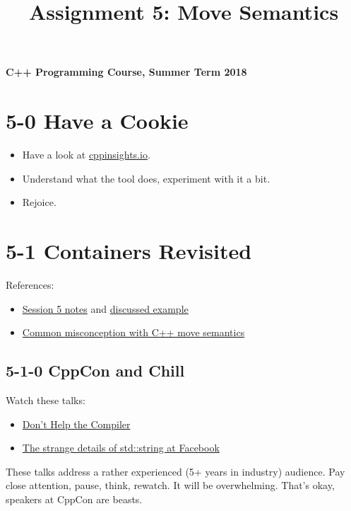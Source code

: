\documentclass[]{article}
\title{Assignment 5: Move Semantics}
\date{}
\providecommand{\tightlist}{%
  \setlength{\itemsep}{0pt}\setlength{\parskip}{0pt}}
\begin{document}
\maketitle

\textbf{C++ Programming Course, Summer Term 2018}

\section{5-0 Have a Cookie}\label{have-a-cookie}

\begin{itemize}
\tightlist
\item
  Have a look at \href{https://cppinsights.io/}{cppinsights.io}.
\item
  Understand what the tool does, experiment with it a bit.
\item
  Rejoice.
\end{itemize}

\section{5-1 Containers Revisited}\label{containers-revisited}

References:

\begin{itemize}
\tightlist
\item
  \href{/session-05/}{Session 5 notes} and
  \href{/session-05/01-move/}{discussed example}
\item
  \href{https://pagefault.blog/2018/03/01/common-misconception-with-cpp-move-semantics/}{Common
  misconception with C++ move semantics}
\end{itemize}

\subsection{5-1-0 CppCon and Chill}\label{cppcon-and-chill}

Watch these talks:

\begin{itemize}
\tightlist
\item
  \href{https://www.youtube.com/watch?v=AKtHxKJRwp4}{Don't Help the
  Compiler}
\item
  \href{https://www.youtube.com/watch?v=kPR8h4-qZdk}{The strange details
  of std::string at Facebook}
\end{itemize}

These talks address a rather experienced (5+ years in industry)
audience. Pay close attention, pause, think, rewatch. It will be
overwhelming. That's okay, speakers at CppCon are beasts.
\end{document}
